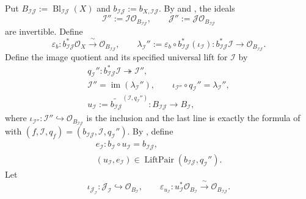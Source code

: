 \begin{definition}
  Put $B_{\mathcal I\mathcal J}:=
  \operatorname{Bl}_{\mathcal I\mathcal J}(X)$ and
  $b_{\mathcal I\mathcal J}:=b_{X,\mathcal I\mathcal J}$.  By
   and
  , the ideals
  \[
    \mathcal I'':=\mathcal I\mathcal O_{B_{\mathcal I\mathcal J}},
    \qquad
    \mathcal J'':=\mathcal J\mathcal O_{B_{\mathcal I\mathcal J}}
  \]
  are invertible.  Define
  \[
    \varepsilon_b\colon
      b_{\mathcal I\mathcal J}^*\mathcal O_X
        \xrightarrow{\ \sim\ }\mathcal O_{B_{\mathcal I\mathcal J}},
    \qquad
    \lambda_{\mathcal I}'':=
      \varepsilon_b\circ b_{\mathcal I\mathcal J}^*
        (\iota_{\mathcal I})\colon
      b_{\mathcal I\mathcal J}^*\mathcal I
        \longrightarrow\mathcal O_{B_{\mathcal I\mathcal J}}.
  \]
  Define the image quotient and its specified universal lift for
  $\mathcal I$ by
  \[
  \begin{gathered}
    q_{\mathcal I}''\colon
      b_{\mathcal I\mathcal J}^*\mathcal I
        \twoheadrightarrow\mathcal I'',\\
    \mathcal I''=\operatorname{im}(\lambda_{\mathcal I}''),\qquad
    \iota_{\mathcal I''}\circ q_{\mathcal I}''
      =\lambda_{\mathcal I}'',\\
    u_{\mathcal I}:=
      \widetilde{b_{\mathcal I\mathcal J}}^{
        (\mathcal I,q_{\mathcal I}'')}
      \colon B_{\mathcal I\mathcal J}\longrightarrow B_{\mathcal I},
  \end{gathered}
  \]
  where
  $\iota_{\mathcal I''}\colon\mathcal I''\hookrightarrow
  \mathcal O_{B_{\mathcal I\mathcal J}}$ is the inclusion and
  the last line is exactly the formula of
   with
  $(f,\mathcal I,q_f)=(b_{\mathcal I\mathcal J},\mathcal I,q_{\mathcal I}'')$.
  By , define
  \[
  \begin{gathered}
    e_{\mathcal I}\colon
      b_{\mathcal I}\circ u_{\mathcal I}
        =b_{\mathcal I\mathcal J},\\
    (u_{\mathcal I},e_{\mathcal I})
      \in\operatorname{LiftPair}
        (b_{\mathcal I\mathcal J},q_{\mathcal I}'').
  \end{gathered}                                             \tag{BPC0}
  \]
  Let
  \[
    \iota_{\mathcal J_{\mathcal I}}\colon
      \mathcal J_{\mathcal I}\hookrightarrow\mathcal O_{B_{\mathcal I}},
    \qquad
    \varepsilon_{u_{\mathcal I}}\colon
      u_{\mathcal I}^*\mathcal O_{B_{\mathcal I}}
      \xrightarrow{\ \sim\ }\mathcal O_{B_{\mathcal I\mathcal J}}.
\]
\end{definition}
